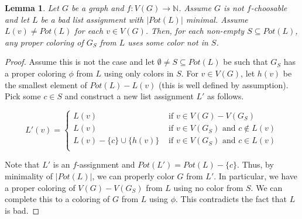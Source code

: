 \documentclass[12pt]{article}
\theoremstyle{plain}
\newtheorem{lem}[thm]{Lemma}
\theoremstyle{definition}
\theoremstyle{remark}
\begin{document}
\begin{lem}\label{CannotColorSelfWithSelf}
Let $G$ be a graph and $f\colon V(G) \rightarrow \mathbb{N}$.  Assume $G$ is not $f$-choosable and let $L$ be a bad list assignment with $|Pot(L)|$ minimal.  Assume $L(v) \neq Pot(L)$ for each $v \in V(G)$.  Then, for each non-empty $S \subseteq Pot(L)$, any proper coloring of $G_S$ from $L$ uses some color not in $S$.
\end{lem}
\begin{proof}
Assume this is not the case and let $\emptyset \neq S \subseteq Pot(L)$ be such that $G_S$ has a proper coloring $\phi$ from $L$ using only colors in $S$.  For $v \in V(G)$, let $h(v)$ be the smallest element of $Pot(L) - L(v)$ (this is well defined by assumption). Pick some $c \in S$ and construct a new list assignment $L'$ as follows.\newline

\[L'(v) = \left \{ \begin{array}{rl}
L(v) &\mbox{ if $v \in V(G) - V(G_S)$} \\
L(v) &\mbox{ if $v \in V(G_S)$ and $c \not \in L(v)$} \\
L(v) - \{c\} \cup \{h(v)\} &\mbox{ if $v \in V(G_S)$ and $c\in L(v)$} \\
\end{array} \right.\]

Note that $L'$ is an $f$-assignment and $Pot(L') = Pot(L) - \{c\}$.  Thus, by minimality of $|Pot(L)|$, we can properly color $G$ from $L'$.  In particular, we have a proper coloring of $V(G) - V(G_S)$ from $L$ using no color from $S$.  We can complete this to a coloring of $G$ from $L$ using $\phi$. This contradicts the fact that $L$ is bad.  
\end{proof}
\end{document}
